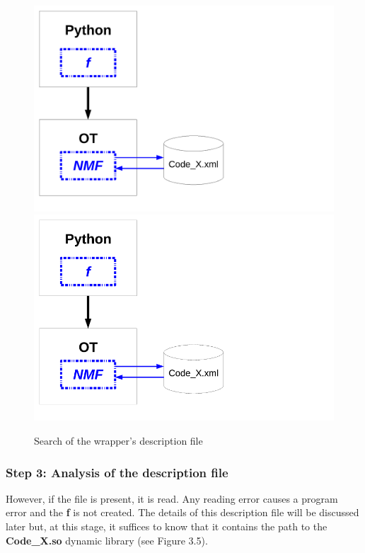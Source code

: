 \begin{figure}
  \begin{center}
    \ifpdf
    \includegraphics[width=12cm]{Figure4.pdf}
    \else
    \includegraphics[width=12cm]{Figure4.png}
    \fi
    \caption[Figure 4]{Search of the wrapper's description file}
  \end{center}
\end{figure}

\subsubsection{Step 3: Analysis of the description file}

However, if the file is present, it is read. Any reading error causes a program error and the {\bf f} is not created. The details of this description file will be discussed later but, at this stage, it suffices to know that it contains the path to the {\bf Code\_X.so} dynamic library (see Figure 3.5).


